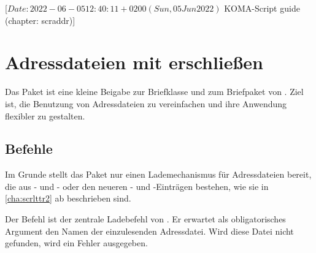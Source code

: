 %
%
%
%
%
%
%

                 [$Date: 2022-06-05 12:40:11 +0200 (Sun, 05 Jun 2022) $
                  KOMA-Script guide (chapter: scraddr)]

\chapter{Adressdateien mit  erschließen}%
%
\BeginIndexGroup
{}

Das Paket  ist eine kleine Beigabe zur Briefklasse und zum
Briefpaket von \KOMAScript.  Ziel ist, die Benutzung von Adressdateien zu
vereinfachen und ihre Anwendung flexibler zu gestalten.

\section{Befehle}

Im Grunde stellt das Paket nur einen Lademechanismus für Adressdateien bereit,
die aus - und
- oder den neueren
- und
-Einträgen bestehen, wie sie in
\autoref{cha:scrlttr2} ab  beschrieben
sind.


\begin{Declaration}
\end{Declaration}%
Der Befehl  ist der zentrale Ladebefehl
von .
Er erwartet als obligatorisches Argument den
Namen der einzulesenden Adressdatei.
Wird diese Datei nicht gefunden, wird ein Fehler ausgegeben.

